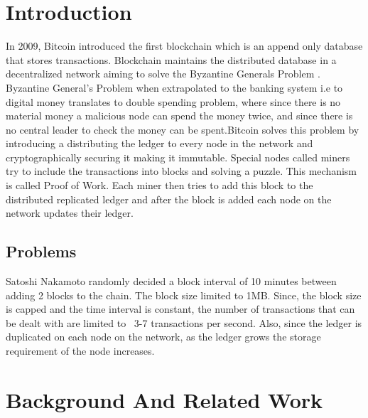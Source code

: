 \documentclass[conference]{IEEEtran}
\begin{document}
\section{Introduction}
In 2009, Bitcoin\cite{bitcoin} introduced the first blockchain which is an
append only database that stores transactions. Blockchain maintains the
distributed database in a decentralized network aiming to solve the Byzantine
Generals Problem \cite{bgp}. Byzantine General's Problem when extrapolated to
the banking system i.e to digital money translates to double spending problem,
where since there is no material money a malicious node can spend the money
twice, and since there is no central leader to check the money can be
spent.Bitcoin solves this problem by introducing a distributing the ledger to
every node in the network and cryptographically securing it making it immutable.
Special nodes called miners try to include the transactions into blocks and
solving a puzzle. This mechanism is called Proof of Work. Each miner then tries
to add this block to the distributed replicated ledger and after the block is
added each node on the network updates their ledger.

\subsection{Problems}
Satoshi Nakamoto randomly decided a block interval of 10 minutes between adding
2 blocks to the chain. The block size limited to 1MB. Since, the block size is
capped and the time interval is constant, the number of transactions that can be
dealt with are limited to ~3-7 transactions per second. 
Also, since the ledger is duplicated on each node on the network, as the ledger
grows the storage requirement of the node increases. 


\section{Background And Related Work}
\end{document}
